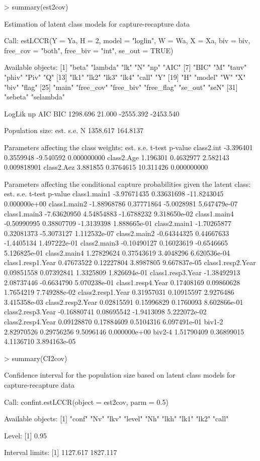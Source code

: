 \begin{example*}
> summary(est2cov)

Estimation of latent class models for capture-recapture data

Call:
estLCCR(Y = Ya, H = 2, model = "loglin", W = Wa, X = Xa, biv = biv,
    free_cov = "both", free_biv = "int", se_out = TRUE)

Available objects:
 [1] "beta"      "lambda"    "lk"        "N"         "np"        "AIC"
 [7] "BIC"       "M"         "tauv"      "phiv"      "Piv"       "Q"
[13] "lk1"       "lk2"       "lk3"       "lk4"       "call"      "Y"
[19] "H"         "model"     "W"         "X"         "biv"       "flag"
[25] "main"      "free_cov"  "free_biv"  "free_flag" "se_out"    "seN"
[31] "sebeta"    "selambda"

   LogLik        np       AIC       BIC
 1298.696    21.000 -2555.392 -2453.540

Population size:
      est.     s.e.
N 1358.617 164.8137

Parameters affecting the class weights:
                est.      s.e.    t-test     p-value
class2.int -3.396401 0.3559948 -9.540592 0.000000000
class2.Age  1.196301 0.4632977  2.582143 0.009818901
class2.Aez  3.881855 0.3764615 10.311426 0.000000000

Parameters affecting the conditional capture probabilities given the latent class:
                         est.       s.e.      t-test      p-value
class1.main1      -3.97671435 0.33631698 -11.8243045 0.000000e+00
class1.main2      -1.88968786 0.37771864  -5.0028981 5.647479e-07
class1.main3      -7.63620950 4.54854883  -1.6788232 9.318650e-02
class1.main4      -0.50990995 0.38807709  -1.3139398 1.888665e-01
class2.main1      -1.70265877 0.32081373  -5.3073127 1.112532e-07
class2.main2      -0.64344325 0.44667633  -1.4405134 1.497222e-01
class2.main3      -0.10490127 0.16023619  -0.6546665 5.126825e-01
class2.main4       1.27829624 0.37543619   3.4048296 6.620536e-04
class1.resp1.Year  0.47673522 0.12227804   3.8987805 9.667837e-05
class1.resp2.Year  0.09851558 0.07392841   1.3325809 1.826694e-01
class1.resp3.Year -1.38492913 2.08737446  -0.6634790 5.070238e-01
class1.resp4.Year  0.17408169 0.09860628   1.7654219 7.749288e-02
class2.resp1.Year  0.31957031 0.10915597   2.9276486 3.415358e-03
class2.resp2.Year  0.02815591 0.15996829   0.1760093 8.602866e-01
class2.resp3.Year -0.16880741 0.08695542  -1.9413098 5.222072e-02
class2.resp4.Year  0.09128870 0.17884609   0.5104316 6.097491e-01
biv1-2             2.82970526 0.29756256   9.5096146 0.000000e+00
biv2-4             1.51790409 0.36899015   4.1136710 3.894163e-05

> summary(CI2cov)

Confidence interval for the population size based on latent class models
for capture-recapture data

Call:
confint.estLCCR(object = est2cov, parm = 0.5)

Available objects:
[1] "conf"  "Nv"    "lkv"   "level" "Nh"    "lkh"   "lk1"   "lk2"   "call"

Level:
[1] 0.95

Interval limits:
[1] 1127.617 1827.117
\end{example*}

